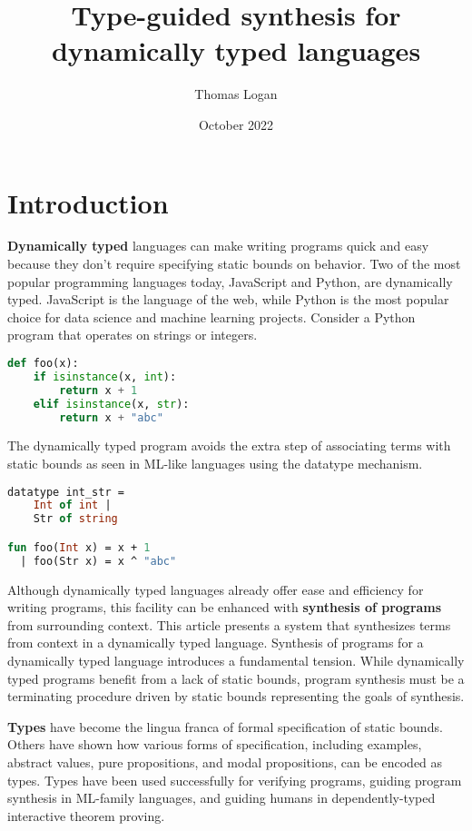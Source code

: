 \documentclass[sigplan,screen]{acmart}
\title{Type-guided synthesis for dynamically typed languages}
\author{Thomas Logan}
\date{October 2022}
\begin{document}
\maketitle

\section{Introduction}

\textbf{Dynamically typed} languages can make writing programs quick and easy 
because they don't require specifying static bounds on behavior.
Two of the most popular programming languages today, JavaScript and Python, 
are dynamically typed. 
JavaScript is the language of the web, while Python is the most popular choice
for data science and machine learning projects. 
Consider a Python program that operates on strings or integers. 

\begin{lstlisting}[language=Python]
def foo(x):
    if isinstance(x, int):
        return x + 1 
    elif isinstance(x, str): 
        return x + "abc"
\end{lstlisting}

\noindent The dynamically typed program avoids the extra step of associating terms with
static bounds as seen in ML-like languages using the datatype mechanism. 

\begin{lstlisting}[language=ML]
datatype int_str = 
    Int of int | 
    Str of string

fun foo(Int x) = x + 1
  | foo(Str x) = x ^ "abc"
\end{lstlisting}


Although dynamically typed languages already offer ease and efficiency for writing programs, 
this facility can be enhanced with \textbf{synthesis of programs} 
from surrounding context. 
This article presents a system that synthesizes terms from context 
in a dynamically typed language.
Synthesis of programs for a dynamically typed language introduces a fundamental tension. 
While dynamically typed programs benefit from a lack of static bounds, program synthesis
must be a terminating procedure driven by static bounds representing the goals of synthesis.   

\textbf{Types} have become the lingua franca of formal specification of static bounds.
Others have shown how various forms of specification, including examples, abstract values, 
pure propositions, and modal propositions, can be encoded as types.
Types have been used successfully for verifying programs, 
guiding program synthesis in ML-family languages, 
and guiding humans in dependently-typed interactive theorem proving. 
\end{document}
